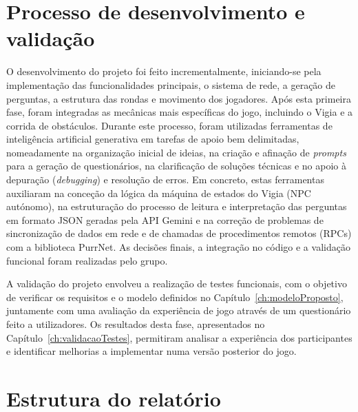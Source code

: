 \section{Processo de desenvolvimento e validação}
\label{sec:processoDesenvolvimento}

O desenvolvimento do projeto foi feito incrementalmente, iniciando-se pela implementação das funcionalidades principais, o sistema de rede, a geração de perguntas, a estrutura das rondas e movimento dos jogadores. Após esta primeira fase, foram integradas as mecânicas mais específicas do jogo, incluindo o Vigia e a corrida de obstáculos. Durante este processo, foram utilizadas ferramentas de inteligência artificial generativa em tarefas de apoio bem delimitadas, nomeadamente na organização inicial de ideias, na criação e afinação de \textit{prompts} para a geração de questionários, na clarificação de soluções técnicas e no apoio à depuração (\textit{debugging}) e resolução de erros. Em concreto, estas ferramentas auxiliaram na conceção da lógica da máquina de estados do Vigia (NPC autónomo), na estruturação do processo de leitura e interpretação das perguntas em formato JSON geradas pela API Gemini e na correção de problemas de sincronização de dados em rede e de chamadas de procedimentos remotos (RPCs) com a biblioteca PurrNet. As decisões finais, a integração no código e a validação funcional foram realizadas pelo grupo.

A validação do projeto envolveu a realização de testes funcionais, com o objetivo de verificar os requisitos e o modelo definidos no Capítulo~\ref{ch:modeloProposto}, juntamente com uma avaliação da experiência de jogo através de um questionário feito a utilizadores. Os resultados desta fase, apresentados no Capítulo~\ref{ch:validacaoTestes}, permitiram analisar a experiência dos participantes e identificar melhorias a implementar numa versão posterior do jogo.


\section{Estrutura do relatório}
\label{sec:estrutura}

